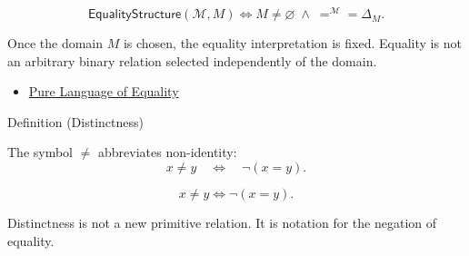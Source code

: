 \begin{remark*}
\[
  \mathsf{EqualityStructure}(\mathcal M,M)
  \Longleftrightarrow
  M\neq\varnothing
  \;\wedge\;
  =^{\mathcal M}=\Delta_M.
\]
\end{remark*}

\begin{remark*}[Interpretation]
Once the domain \(M\) is chosen, the equality interpretation is fixed. Equality
is not an arbitrary binary relation selected independently of the domain.
\end{remark*}


\begin{dependencies}
\begin{itemize}
  \item \hyperref[def:axiomatic-equality-language]{Pure Language of Equality}
\end{itemize}
\end{dependencies}

\begin{definitionbox}{Definition (Distinctness)}
\begin{definition}[Distinctness]\label{def:distinctness}
The symbol \(\neq\) abbreviates non-identity:
\[
  x\neq y
  \quad\Longleftrightarrow\quad
  \neg(x=y).
\]
\end{definition}
\end{definitionbox}

\begin{remark*}
\[
  x\neq y
  \Longleftrightarrow
  \neg(x=y).
\]
\end{remark*}

\begin{remark*}[Interpretation]
Distinctness is not a new primitive relation. It is notation for the negation
of equality.
\end{remark*}

